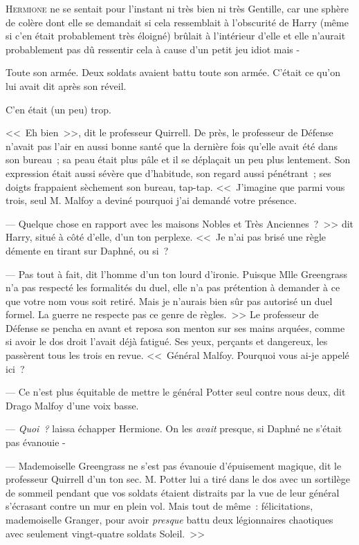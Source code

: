 
\lettrine{H}{ermione} ne se sentait pour l'instant ni très bien ni très Gentille, car une sphère de colère dont elle se demandait si cela ressemblait à l'obscurité de Harry (même si c'en était probablement très éloigné) brûlait à l'intérieur d'elle et elle n'aurait probablement pas dû ressentir cela à cause d'un petit jeu idiot mais -

Toute son armée. Deux soldats avaient battu toute son armée. C'était ce qu'on lui avait dit après son réveil.

C'en était (un peu) trop.

<<~Eh bien~>>, dit le professeur Quirrell. De près, le professeur de Défense n'avait pas l'air en aussi bonne santé que la dernière fois qu'elle avait été dans son bureau~; sa peau était plus pâle et il se déplaçait un peu plus lentement. Son expression était aussi sévère que d'habitude, son regard aussi pénétrant~; ses doigts frappaient sèchement son bureau, tap-tap. <<~J'imagine que parmi vous trois, seul M. Malfoy a deviné pourquoi j'ai demandé votre présence.

--- Quelque chose en rapport avec les maisons Nobles et Très Anciennes~?~>> dit Harry, situé à côté d'elle, d'un ton perplexe. <<~Je n'ai pas brisé une règle démente en tirant sur Daphné, ou si~?

--- Pas tout à fait, dit l'homme d'un ton lourd d'ironie. Puisque Mlle Greengrass n'a pas respecté les formalités du duel, elle n'a pas prétention à demander à ce que votre nom vous soit retiré. Mais je n'aurais bien sûr pas autorisé un duel formel. La guerre ne respecte pas ce genre de règles.~>> Le professeur de Défense se pencha en avant et reposa son menton sur ses mains arquées, comme si avoir le dos droit l'avait déjà fatigué. Ses yeux, perçants et dangereux, les passèrent tous les trois en revue. <<~Général Malfoy. Pourquoi vous ai-je appelé ici~?

--- Ce n'est plus équitable de mettre le général Potter seul contre nous deux, dit Drago Malfoy d'une voix basse.

--- \emph{Quoi~?} laissa échapper Hermione. On les \emph{avait} presque, si Daphné ne s'était pas évanouie -

--- Mademoiselle Greengrass ne s'est pas évanouie d'épuisement magique, dit le professeur Quirrell d'un ton sec. M. Potter lui a tiré dans le dos avec un sortilège de sommeil pendant que vos soldats étaient distraits par la vue de leur général s'écrasant contre un mur en plein vol. Mais tout de même~: félicitations, mademoiselle Granger, pour avoir \emph{presque} battu deux légionnaires chaotiques avec seulement vingt-quatre soldats Soleil.~>>

